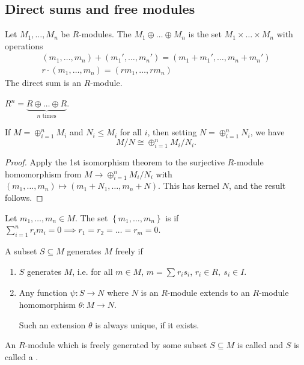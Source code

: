 \documentclass[egregdoesnotlikesansseriftitles,a4paper]{scrartcl}
\begin{document}
\subsection{Direct sums and free modules}
\begin{definition*}
       Let $M_1 , \ldots, M_n$ be $R$-modules. The  $M_1 \oplus \ldots \oplus M_n$ is the set $M_1 \times \ldots \times M_n$ with operations 
       \begin{align*}
             (m_1 , \ldots, m_n)+ (m_1' , \ldots, m_n')=(m_1+m_1' , \ldots, m_n+m_n')\\
             r \cdot (m_1 , \ldots, m_n)=(rm_1 , \ldots, rm_n)
       \end{align*}
       The direct sum is an $R$-module.
       \begin{example*}
              $R^{n}= \underbrace{R \oplus \ldots \oplus R}_{n \text{ times} } $.
       \end{example*}
\end{definition*}
\begin{lemma}\label{lem151}
       If $M= \oplus_{i=1}^{n}M_{i}$ and $N_{i}\leq M_{i}$ for all $i$, then setting $N =\oplus_{i=1}^{n}N_{i}$, we have \[
       M/N \cong \oplus_{i=1}^{n}M_{i}/N_{i}
       .\]
       \begin{proof}
              Apply the 1st isomorphism theorem to the surjective $R$-module homomorphism from $M \rightarrow \oplus_{i=1}^{n}M_{i}/N_{i}$ with $(m_1 , \ldots, m_n)\mapsto (m_1 + N_1 ,\ldots, m_n+N)$. This has kernel $N$, and the result follows.
       \end{proof}
\end{lemma}
\begin{definition*}[Independence]
       Let $m_1 , \ldots,m_n \in M$. The set $\left\{m_1 , \ldots, m_n\right\}$ is  if $\sum_{i=1}^{n}r_{i}m_{i}=0 \implies r_1 =r_2 =\ldots=r_m=0$.
\end{definition*}
\begin{definition*}
       A subset $S \subseteq M$ generates $M$ freely if 
       \begin{enumerate}
             \item $S$ generates $M$, i.e. for all $m \in M$, $m=\sum_{}^{}r_{i}s_i$, $r_i \in R, \ s_i \in I$.
             \item Any function $\psi: S \rightarrow N$ where $N$ is an $R$-module extends to an $R$-module homomorphism $\theta: M \rightarrow N$.
             \begin{remark}
                  Such an extension $\theta$ is always unique, if it exists.
           \end{remark}
       \end{enumerate}
       An $R$-module which is freely generated by some subset $S \subseteq M$ is called  and $S$ is called a .
\end{definition*}
\end{document}
